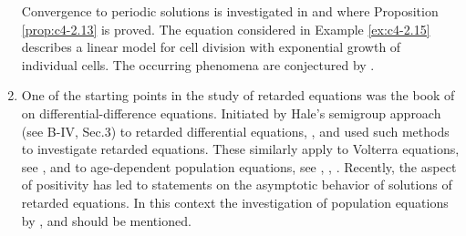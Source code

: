 \begin{enumerate}[label=\emph{Section \arabic*:}, wide, itemsep=1ex]
Convergence to periodic solutions is investigated in \citet{kerscherNagel:1984} and \citet{nagel:1984} where Proposition \ref{prop:c4-2.13} is proved.
The equation considered in Example \ref{ex:c4-2.15} describes a linear model for cell division with exponential growth of individual cells.
The occurring phenomena are conjectured by \citet{diekmannetal:1984}.

\item%
One of the starting points in the study of retarded equations was the book of \citet{bellmancooke:1963} on differential-difference equations.
Initiated by Hale's semigroup approach (see B-IV, Sec.3) to retarded differential equations, \citet{dysonvillella:1979}, \citet{villellabressan:1985} and \citet{webb:1977} used such methods to investigate retarded equations.
These similarly apply to Volterra equations, see \citet{miller:1974}, \citet{webb:1977} and to age-dependent population equations, see \citet{Pruess:1981}, \citet{webb:1984}, \citet{webb:1985a}.
Recently, the aspect of positivity has led to statements on the asymptotic behavior of solutions of retarded equations.
In this context the investigation of population equations by \citet{greiner:1984}, \citet{heijmans:1985a} and \citet{webb:1985b} should be mentioned.

\end{enumerate}

{\RaggedRight

}

